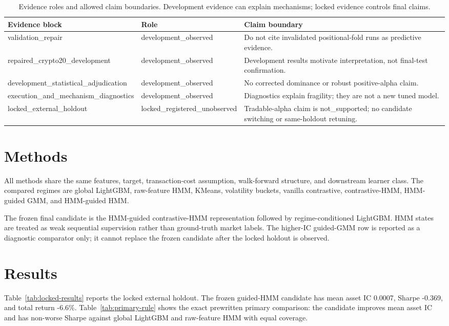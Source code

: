 \documentclass[sigconf,anonymous,review]{acmart}
\begin{document}
\begin{table}[t]
\caption{Evidence roles and allowed claim boundaries. Development evidence can explain mechanisms; locked evidence controls final claims.}
\label{tab:evidence-boundaries}
\small
\begin{tabularx}{\textwidth}{p{}p{}Y}
\toprule
Evidence block & Role & Claim boundary \\
\midrule
validation\_repair & development\_observed & Do not cite invalidated positional-fold runs as predictive evidence. \\
repaired\_crypto20\_development & development\_observed & Development results motivate interpretation, not final-test confirmation. \\
development\_statistical\_adjudication & development\_observed & No corrected dominance or robust positive-alpha claim. \\
execution\_and\_mechanism\_diagnostics & development\_observed & Diagnostics explain fragility; they are not a new tuned model. \\
locked\_external\_holdout & locked\_registered\_unobserved & Tradable-alpha claim is not\_supported; no candidate switching or same-holdout retuning. \\
\bottomrule
\end{tabularx}
\end{table}

\section{Methods}
All methods share the same features, target, transaction-cost assumption, walk-forward structure, and downstream learner class. The compared regimes are global LightGBM, raw-feature HMM, KMeans, volatility buckets, vanilla contrastive, contrastive-HMM, HMM-guided GMM, and HMM-guided HMM.

The frozen final candidate is the HMM-guided contrastive-HMM representation followed by regime-conditioned LightGBM. HMM states are treated as weak sequential supervision rather than ground-truth market labels. The higher-IC guided-GMM row is reported as a diagnostic comparator only; it cannot replace the frozen candidate after the locked holdout is observed.

\section{Results}
Table~\ref{tab:locked-results} reports the locked external holdout. The frozen guided-HMM candidate has mean asset IC 0.0007, Sharpe -0.369, and total return -6.6\%. Table~\ref{tab:primary-rule} shows the exact prewritten primary comparison: the candidate improves mean asset IC and has non-worse Sharpe against global LightGBM and raw-feature HMM with equal coverage.
\end{document}
